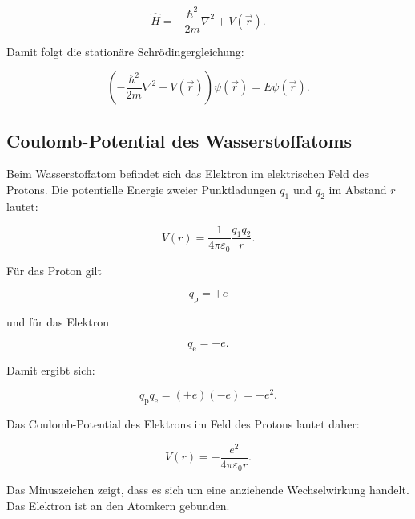 \begin{equation}
	\hat{H}
	=
	-\frac{\hbar^2}{2m}\nabla^2
	+
	V(\vec r).
	\label{eq:app_hamilton_operator_allgemein}
\end{equation}

Damit folgt die stationäre Schrödingergleichung:

\begin{equation}
	\left(
	-\frac{\hbar^2}{2m}\nabla^2
	+
	V(\vec r)
	\right)\psi(\vec r)
	=
	E\psi(\vec r).
	\label{eq:app_stationaere_schroedingergleichung_potential}
\end{equation}

\subsection*{Coulomb-Potential des Wasserstoffatoms}

Beim Wasserstoffatom befindet sich das Elektron im elektrischen Feld des
Protons. Die potentielle Energie zweier Punktladungen \(q_1\) und \(q_2\) im
Abstand \(r\) lautet:

\begin{equation}
	V(r)
	=
	\frac{1}{4\pi\varepsilon_0}
	\frac{q_1 q_2}{r}.
	\label{eq:app_coulomb_potential_allgemein}
\end{equation}

Für das Proton gilt

\begin{equation}
	q_\mathrm{p} = +e
	\label{eq:app_ladung_proton}
\end{equation}

und für das Elektron

\begin{equation}
	q_\mathrm{e} = -e .
	\label{eq:app_ladung_elektron}
\end{equation}

Damit ergibt sich:

\begin{equation}
	q_\mathrm{p} q_\mathrm{e}
	=
	(+e)(-e)
	=
	-e^2 .
	\label{eq:app_ladungsprodukt_wasserstoff}
\end{equation}

Das Coulomb-Potential des Elektrons im Feld des Protons lautet daher:

\begin{equation}
	V(r)
	=
	-\frac{e^2}{4\pi\varepsilon_0 r}.
	\label{eq:app_coulomb_potential_wasserstoff}
\end{equation}

Das Minuszeichen zeigt, dass es sich um eine anziehende Wechselwirkung handelt.
Das Elektron ist an den Atomkern gebunden.

